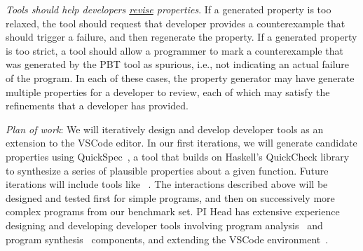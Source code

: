 \textit{Tools should help developers \underline{revise} properties}. If a generated
property is too relaxed, the tool should request that developer provides a
counterexample that should trigger a failure, and then regenerate the property.
If a generated property is too strict, a tool should allow a programmer to mark
a counterexample that was generated by the PBT tool as spurious, i.e., not
indicating an actual failure of the program. In each of these cases, the
property generator may have generate multiple properties for a developer to
review, each of which may satisfy the refinements that a developer has provided.

\textit{Plan of work}: We will iteratively design and develop developer tools as
an extension to the VSCode editor. In our first iterations, we will generate
candidate properties using QuickSpec~\cite{ref:claessen2010quickspec}, a tool that
builds on Haskell's QuickCheck library to synthesize a series of plausible
properties about a given function. Future iterations will include tools like
~\cite{smith_discovering_2017}.
The interactions described above will be
designed and tested first for simple programs, and then on successively more
complex programs from our benchmark set. PI Head has extensive experience
designing and developing developer tools involving program
analysis~\cite{ref:head2018interactive,ref:head2019managing} and program
synthesis~\cite{ref:head2017writing} components, and extending the VSCode
environment~\cite{ref:head2020composing}.





